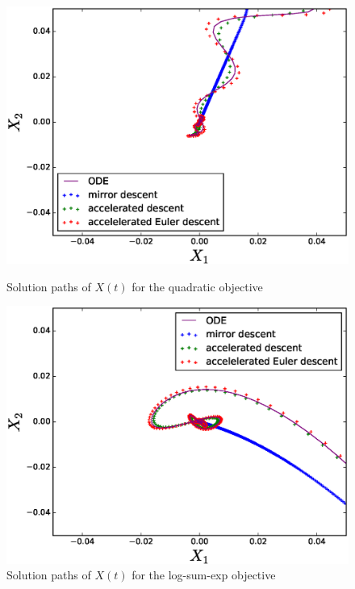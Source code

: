 \begin{figure}[!htb]
  \includegraphics[width=1\linewidth]{Experiments/amd-quadratic-paths.eps}
\caption{Solution paths of $X(t)$ for the quadratic objective}
\label{fig: quadpath}
\endminipage\hfill
{}%
 \includegraphics[width=1\linewidth]{Experiments/amd-logsumexp-paths.eps}
\caption{Solution paths of $X(t)$ for the log-sum-exp objective}
\label{fig: logsumexppath}
\endminipage
\end{figure}